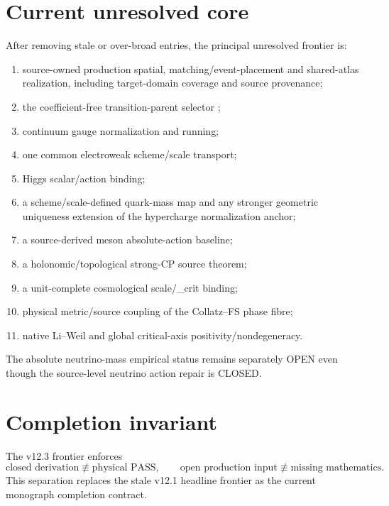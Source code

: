 \documentclass[11pt,a4paper,twoside]{book}
\def\({}%
\def\){}%
\theoremstyle{definition}
\begin{document}
\section{Current unresolved core}

After removing stale or over-broad entries, the principal unresolved frontier
is:
\begin{enumerate}
\item source-owned production spatial, matching/event-placement and shared-atlas
      realization, including target-domain coverage and source provenance;
\item the coefficient-free transition-parent selector \(\Sigma\);
\item continuum gauge normalization and running;
\item one common electroweak scheme/scale transport;
\item Higgs scalar/action binding;
\item a scheme/scale-defined quark-mass map and any stronger geometric
      uniqueness extension of the hypercharge normalization anchor;
\item a source-derived meson absolute-action baseline;
\item a holonomic/topological strong-CP source theorem;
\item a unit-complete cosmological scale/\(\rho_{\rm crit}\) binding;
\item physical metric/source coupling of the Collatz--FS phase fibre;
\item native Li--Weil and global critical-axis positivity/nondegeneracy.
\end{enumerate}

The absolute neutrino-mass empirical status remains separately OPEN even though
the source-level neutrino action repair is CLOSED.

\section{Completion invariant}

The v12.3 frontier enforces
\[
\boxed{
\text{closed derivation}\not\equiv\text{physical PASS},
\qquad
\text{open production input}\not\equiv\text{missing mathematics}.
}
\]
This separation replaces the stale v12.1 headline frontier as the current
monograph completion contract.

\clearpage
\end{document}
